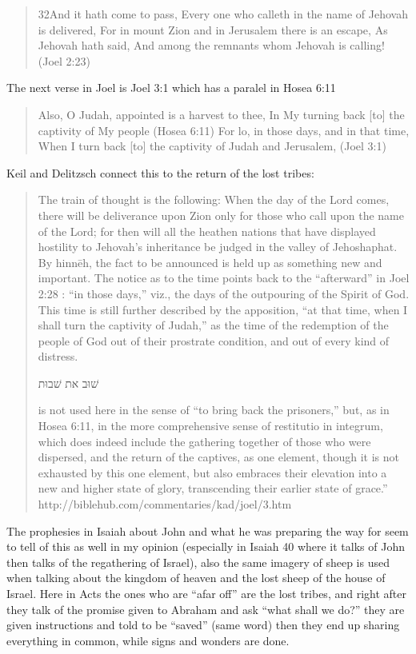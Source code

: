 \documentclass[11pt]{article}
\begin{document}
\begin{quote}
32And it hath come to pass, Every one who calleth in the name of Jehovah is delivered, For in mount Zion and in Jerusalem there is an escape, As Jehovah hath said, And among the remnants whom Jehovah is calling! (Joel 2:23)
\end{quote}
The next verse in Joel is Joel 3:1 which has a paralel in Hosea 6:11
\begin{quote}
Also, O Judah, appointed is a harvest to thee, In My turning back [to] the captivity of My people (Hosea 6:11)
For lo, in those days, and in that time, When I turn back [to] the captivity of Judah and Jerusalem, (Joel 3:1)
\end{quote}
Keil and Delitzsch connect this to the return of the lost tribes:
\begin{quote} The train of thought is the following: When the day of the Lord comes, there will be deliverance upon Zion only for those who call upon the name of the Lord; for then will all the heathen nations that have displayed hostility to Jehovah’s inheritance be judged in the valley of Jehoshaphat. By hinnēh, the fact to be announced is held up as something new and important. The notice as to the time points back to the “afterward” in Joel 2:28 : “in those days,” viz., the days of the outpouring of the Spirit of God. This time is still further described by the apposition, “at that time, when I shall turn the captivity of Judah,” as the time of the redemption of the people of God out of their prostrate condition, and out of every kind of distress. \begin{hebrew} שׁוּב את שׁבוּת \end{hebrew} is not used here in the sense of “to bring back the prisoners,” but, as in Hosea 6:11, in the more comprehensive sense of restitutio in integrum, which does indeed include the gathering together of those who were dispersed, and the return of the captives, as one element, though it is not exhausted by this one element, but also embraces their elevation into a new and higher state of glory, transcending their earlier state of grace.”
http://biblehub.com/commentaries/kad/joel/3.htm
\end{quote}
The prophesies in Isaiah about John and what he was preparing the way
for seem to tell of this as well in my opinion (especially in Isaiah
40 where it talks of John then talks of the regathering of Israel),
also the same imagery of sheep is used when talking about the kingdom
of heaven and the lost sheep of the house of Israel.
Here in Acts the ones who are “afar off” are the lost tribes, and right after they talk of the promise given to Abraham and ask “what shall we do?” they are
given instructions and told to be “saved” (same word) then they end up
sharing everything in common, while signs and wonders are done.
\end{document}
